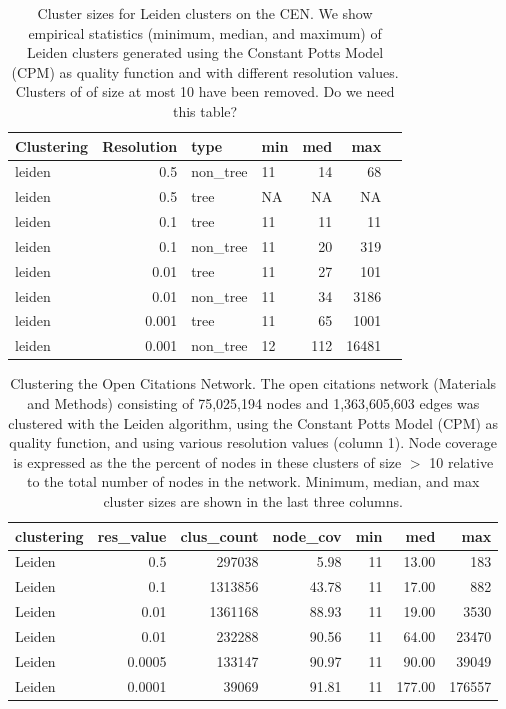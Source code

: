 \documentclass[a4paper]{article}   	%
\begin{document}
\begin{table}[ht]
\centering
\begin{tabular}{lrllrrr}
  \hline
 Clustering & Resolution & type & min & med & max \\
  \hline
leiden & 0.5 & non\_tree &  11 & 14 &  68 \\
leiden & 0.5 & tree &  NA & NA &  NA \\
leiden & 0.1 & tree &  11 & 11 &  11 \\
leiden  & 0.1 & non\_tree &  11 & 20 & 319 \\
leiden  & 0.01 & tree &  11 & 27 & 101 \\
leiden & 0.01 & non\_tree &  11 & 34 & 3186 \\
leiden & 0.001 & tree &  11 & 65 & 1001 \\
leiden & 0.001 & non\_tree &  12 & 112 & 16481 \\

   \hline
\end{tabular}
\caption{Cluster sizes for Leiden clusters on the CEN. We show empirical statistics (minimum, median, and maximum) of Leiden clusters generated using the Constant Potts Model (CPM) as quality function and with different resolution values. Clusters of of size at most 10 have been removed. Do we need this table?}
\end{table}

\begin{table}[ht]
\centering
\begin{tabular}{lrrrrrr}
  \hline
 clustering & res\_value & clus\_count & node\_cov & min & med & max \\
  \hline
Leiden & 0.5 & 297038 & 5.98 &  11 & 13.00 & 183 \\
Leiden & 0.1 & 1313856 & 43.78 &  11 & 17.00 & 882 \\
Leiden & 0.01 & 1361168 & 88.93 &  11 & 19.00 & 3530 \\
Leiden & 0.01 & 232288 & 90.56 &  11 & 64.00 & 23470 \\
Leiden & 0.0005 & 133147 & 90.97 &  11 & 90.00 & 39049 \\
Leiden & 0.0001 & 39069 & 91.81 &  11 & 177.00 & 176557 \\
   \hline
\end{tabular}
\caption{Clustering the Open Citations Network. The open citations network (Materials and Methods) consisting of 75,025,194 nodes and 1,363,605,603 edges was clustered with the Leiden algorithm, using the Constant Potts Model (CPM) as quality function, and using various resolution values (column 1). Node coverage is expressed as the the percent of nodes in these clusters of size $>$ 10 relative to the total number of nodes in the network. Minimum, median, and max cluster sizes are shown in the last three columns.  }
\end{table}
\end{document}
